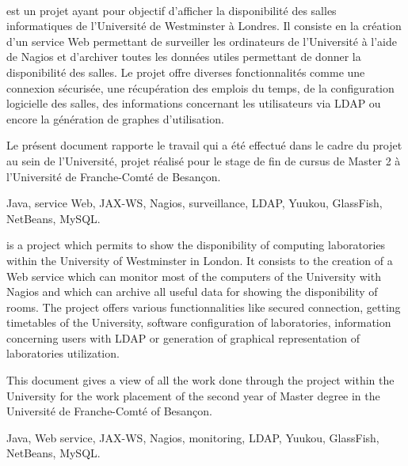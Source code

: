~
\vfill


{\YuukouII} est un projet ayant pour objectif d'afficher la disponibilit\'e des salles informatiques de l'Universit\'e de Westminster \`a Londres.
Il consiste en la cr\'eation d'un service Web permettant de surveiller les ordinateurs de l'Universit\'e \`a l'aide de Nagios et d'archiver toutes les donn\'ees utiles permettant de donner la disponibilit\'e des salles.
Le projet offre diverses fonctionnalit\'es comme une connexion s\'ecuris\'ee, une r\'ecup\'eration des emplois du temps, de la configuration logicielle des salles, des informations concernant les utilisateurs via LDAP ou encore la g\'en\'eration de graphes d'utilisation.

Le pr\'esent document rapporte le travail qui a \'et\'e effectu\'e dans le cadre du projet {\YuukouII} au sein de l'Universit\'e, projet r\'ealis\'e pour le stage de fin de cursus de Master 2 \`a l'Universit\'e de Franche-Comt\'e de Besan\c{c}on.

\vspace{0.5cm}


Java, service Web, JAX-WS, Nagios, surveillance, LDAP, Yuukou, GlassFish, NetBeans, MySQL.

\vspace{1cm}


{\YuukouII} is a project which permits to show the disponibility of computing laboratories within the University of Westminster in London.
It consists to the creation of a Web service which can monitor most of the computers of the University with Nagios and which can archive all useful data for showing the disponibility of rooms.
The project offers various functionnalities like secured connection, getting timetables of the University, software configuration of laboratories, information concerning users with LDAP or generation of graphical representation of laboratories utilization.

This document gives a view of all the work done through the project {\YuukouII} within the University for the work placement of the second year of Master degree in the Universit\'e de Franche-Comt\'e of Besan\c{c}on.

\vspace{0.5cm}


Java, Web service, JAX-WS, Nagios, monitoring, LDAP, Yuukou, GlassFish, NetBeans, MySQL.

\vfill
